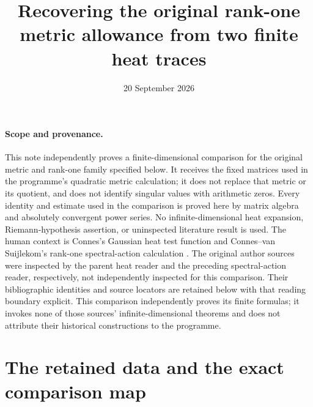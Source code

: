\documentclass[11pt]{article}
\title{Recovering the original rank-one metric allowance from two finite heat traces}
\author{}
\date{20 September 2026}
\begin{document}
\maketitle

\paragraph{Scope and provenance.}
This note independently proves a finite-dimensional comparison for the original
metric and rank-one family specified below. It receives the fixed matrices used
in the programme's quadratic metric calculation; it does not replace that metric
or its quotient, and does not identify singular values with arithmetic zeros.
Every identity and estimate used in the comparison is proved here by matrix
algebra and absolutely convergent power series. No infinite-dimensional heat
expansion, Riemann-hypothesis assertion, or uninspected literature result is used.
The human context is Connes's Gaussian heat test function \cite{ConnesHeat}
and Connes--van Suijlekom's rank-one spectral-action calculation
\cite{ConnesSuijlekom}. The original author sources were inspected by the parent
heat reader and the preceding spectral-action reader, respectively, not
independently inspected for this comparison. Their bibliographic identities
and source locators are retained below with that reading boundary explicit.
This comparison independently proves its finite formulas; it invokes none of
those sources' infinite-dimensional theorems and does not attribute their
historical constructions to the programme.

\section{The retained data and the exact comparison map}
\end{document}
